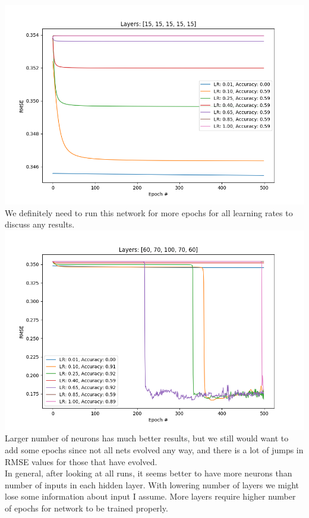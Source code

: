 \documentclass[12pt, letterpaper]{article}
\begin{document}
\begin{enumerate}[label=\Roman*.]
	   {\center \includegraphics[scale=0.7]{../images/rmse_11.png} \\}
	   We definitely need to run this network for more epochs for all learning rates to discuss any results.
	   {\center \includegraphics[scale=0.7]{../images/rmse_12.png} \\}
	   Larger number of neurons has much better results, but we still would want to add some epochs since not all nets evolved any way, and there is a lot of jumps in RMSE values for those that have evolved.\\
	      
	   In general, after looking at all runs, it seems better to have more neurons than number of inputs in each hidden layer. With lowering number of layers we might lose some information about input I assume. More layers require higher number of epochs for network to be trained properly.\\
	      

\end{enumerate}
\end{document}
